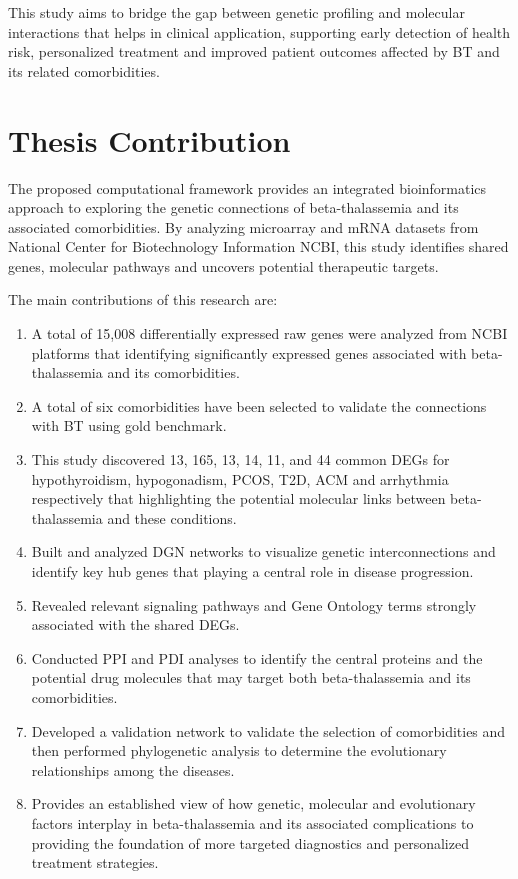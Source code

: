 This study aims to bridge the gap between genetic profiling and molecular interactions that helps in clinical application, supporting early detection of health risk, personalized treatment and improved patient outcomes affected by BT and its related comorbidities.


\section{Thesis Contribution}
\label{sec:sec02}

The proposed computational framework provides an integrated bioinformatics approach to exploring the genetic connections of beta-thalassemia and its associated comorbidities. By analyzing microarray and mRNA datasets from National Center for Biotechnology Information NCBI, this study identifies shared genes, molecular pathways and uncovers potential therapeutic targets. 

The main contributions of this research are:


\begin{enumerate}[label=\arabic*)]
\item A total of 15,008 differentially expressed raw genes were analyzed from NCBI platforms that identifying significantly expressed genes associated with beta-thalassemia and its comorbidities.
\item A total of six comorbidities have been selected to validate the connections with BT using gold benchmark.
\item This study discovered 13, 165, 13, 14, 11, and 44 common DEGs for hypothyroidism, hypogonadism, PCOS, T2D, ACM and arrhythmia respectively that highlighting the potential molecular links between beta-thalassemia and these conditions.
\item Built and analyzed DGN networks to visualize genetic interconnections and identify key hub genes that playing a central role in disease progression.
\item Revealed relevant signaling pathways and Gene Ontology terms strongly associated with the shared DEGs.
\item Conducted PPI and PDI analyses to identify the central proteins and the potential drug molecules that may target both beta-thalassemia and its comorbidities.
\item Developed a validation network to validate the selection of comorbidities and then performed phylogenetic analysis to determine the evolutionary relationships among the diseases.
\item Provides an established view of how genetic, molecular and evolutionary factors interplay in beta-thalassemia and its associated complications to providing the foundation of more targeted diagnostics and personalized treatment strategies.
\end{enumerate}

